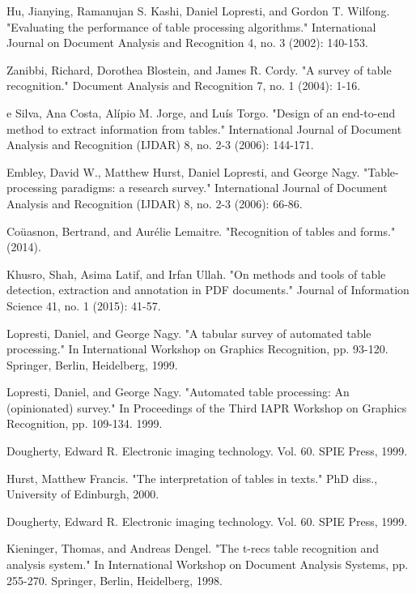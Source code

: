 \documentclass{ieeeaccess}
\begin{document}
\begin{thebibliography}{00}

 Hu, Jianying, Ramanujan S. Kashi, Daniel Lopresti, and Gordon T. Wilfong. "Evaluating the performance of table processing algorithms." International Journal on Document Analysis and Recognition 4, no. 3 (2002): 140-153.

 Zanibbi, Richard, Dorothea Blostein, and James R. Cordy. "A survey of table recognition." Document Analysis and Recognition 7, no. 1 (2004): 1-16.

 e Silva, Ana Costa, Alípio M. Jorge, and Luís Torgo. "Design of an end-to-end method to extract information from tables." International Journal of Document Analysis and Recognition (IJDAR) 8, no. 2-3 (2006): 144-171.


 Embley, David W., Matthew Hurst, Daniel Lopresti, and George Nagy. "Table-processing paradigms: a research survey." International Journal of Document Analysis and Recognition (IJDAR) 8, no. 2-3 (2006): 66-86.

 Coüasnon, Bertrand, and Aurélie Lemaitre. "Recognition of tables and forms." (2014).


 Khusro, Shah, Asima Latif, and Irfan Ullah. "On methods and tools of table detection, extraction and annotation in PDF documents." Journal of Information Science 41, no. 1 (2015): 41-57.

 Lopresti, Daniel, and George Nagy. "A tabular survey of automated table processing." In International Workshop on Graphics Recognition, pp. 93-120. Springer, Berlin, Heidelberg, 1999.

 Lopresti, Daniel, and George Nagy. "Automated table processing: An (opinionated) survey." In Proceedings of the Third IAPR Workshop on Graphics Recognition, pp. 109-134. 1999.

 Dougherty, Edward R. Electronic imaging technology. Vol. 60. SPIE Press, 1999.

 Hurst, Matthew Francis. "The interpretation of tables in texts." PhD diss., University of Edinburgh, 2000.

 Dougherty, Edward R. Electronic imaging technology. Vol. 60. SPIE Press, 1999.

 Kieninger, Thomas, and Andreas Dengel. "The t-recs table recognition and analysis system." In International Workshop on Document Analysis Systems, pp. 255-270. Springer, Berlin, Heidelberg, 1998.


\end{thebibliography}
\end{document}
